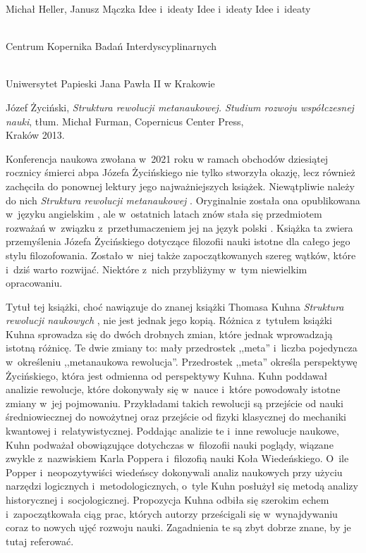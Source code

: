 \begin{newrevplenv2auth}{Michał Heller, Janusz Mączka}
	{Idee i~ideaty}
	{Idee i~ideaty}
	{Idee i~ideaty}
	{\flushright{}\\\subsubsectit\small{Centrum Kopernika Badań Interdyscyplinarnych}\par
	\flushright{}\\\subsubsectit\small{Uniwersytet Papieski Jana Pawła II w Krakowie}\par}
	{Józef Życiński, \textit{Struktura rewolucji metanaukowej. Studium rozwoju współczesnej nauki}, tłum. Michał Furman, Copernicus Center Press,
	\\Kraków 2013.}




\lettrine[loversize=0.13,lines=2,lraise=-0.01,nindent=0em,findent=0.2pt]%
{K}{}onferencja naukowa zwołana w~2021 roku w ramach obchodów dziesiątej rocznicy śmierci abpa Józefa Życińskiego nie tylko stworzyła okazję, lecz również zachęciła do ponownej lektury jego najważniejszych książek. Niewątpliwie należy do nich \textit{Struktura rewolucji metanaukowej}
\parencite[][]{zycinski_struktura_2013}. %
 Oryginalnie została ona opublikowana w~języku angielskim 
\parencite[][]{zycinski_structure_1988}, %
 ale w~ostatnich latach znów stała się przedmiotem rozważań w~związku z~przetłumaczeniem jej na język polski 
\parencites[zob. np.][]{liana_nauka_2019}{liana_jozefa_2020}. %
 Książka ta zwiera przemyślenia Józefa Życińskiego dotyczące filozofii nauki istotne dla całego jego stylu filozofowania. Zostało w~niej także zapoczątkowanych szereg wątków, które i~dziś warto rozwijać. Niektóre z~nich przybliżymy w~tym niewielkim opracowaniu.

Tytuł tej książki, choć nawiązuje do znanej książki Thomasa Kuhna \textit{Struktura rewolucji naukowych}
\parencite[][]{kuhn_struktura_1968}, %
 nie jest jednak jego kopią. Różnica z~tytułem książki Kuhna sprowadza się do dwóch drobnych zmian, które jednak wprowadzają istotną różnicę. Te dwie zmiany to: mały przedrostek ,,meta'' i~liczba pojedyncza w~określeniu ,,metanaukowa rewolucja''. Przedrostek ,,meta'' określa perspektywę Życińskiego, która jest odmienna od perspektywy Kuhna. Kuhn poddawał analizie rewolucje, które dokonywały się w~nauce i~które powodowały istotne zmiany w~jej pojmowaniu. Przykładami takich rewolucji są przejście od nauki średniowiecznej do nowożytnej oraz przejście od fizyki klasycznej do mechaniki kwantowej i~relatywistycznej. Poddając analizie te i~inne rewolucje naukowe, Kuhn podważał obowiązujące dotychczas w~filozofii nauki poglądy, wiązane zwykle z~nazwiskiem Karla Poppera i~filozofią nauki Koła Wiedeńskiego. O~ile Popper i~neopozytywiści wiedeńscy dokonywali analiz naukowych przy użyciu narzędzi logicznych i~metodologicznych, o~tyle Kuhn posłużył się metodą analizy historycznej i~socjologicznej. Propozycja Kuhna odbiła się szerokim echem i~zapoczątkowała ciąg prac, których autorzy prześcigali się w~wynajdywaniu coraz to nowych ujęć rozwoju nauki. Zagadnienia te są zbyt dobrze znane, by je tutaj referować.


\end{newrevplenv2auth}
